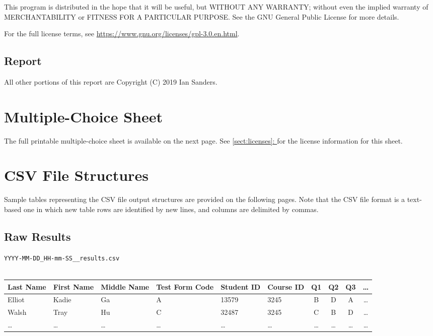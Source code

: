 \documentclass[12pt, letterpaper]{report}
\newcommand*{\sectref}[1]{\hyperref[{#1}]{\ref*{#1}: \nameref*{#1}}}
\newcommand*{\newappendix}[1]{\newpage\section{#1}}
\begin{document}
\begin{appendices}
\begin{displayquote}
This program is distributed in the hope that it will be useful,
but WITHOUT ANY WARRANTY; without even the implied warranty of
MERCHANTABILITY or FITNESS FOR A PARTICULAR PURPOSE.  See the
GNU General Public License for more details.
\end{displayquote}

For the full license terms, see
\url{https://www.gnu.org/licenses/gpl-3.0.en.html}.

\subsection{Report}

All other portions of this report are Copyright (C) 2019 Ian Sanders.

\newappendix{Multiple-Choice Sheet}
\label{sect:sheet}
The full printable multiple-choice sheet is available on the next page. See
\sectref{sect:licenses} for the license information for this sheet.


\newappendix{CSV File Structures}
Sample tables representing the CSV file output structures are provided on the
following pages. Note that the CSV file format is a text-based one in which new
table rows are identified by new lines, and columns are delimited by commas.
\begin{landscape}
\subsection{Raw Results}
\label{sect:rawresults}
\verb!YYYY-MM-DD_HH-mm-SS__results.csv!\\
\\
\begin{tabular}{ l | l | l | l | l | l | c | c | c | c }
  Last Name & First Name & Middle Name & Test Form Code & Student ID & Course ID & Q1 & Q2 & Q3 & \ldots \\
  \hline
  Elliot & Kadie  & Ga     & A      & 13579  & 3245   & B      & D      & A      & \ldots \\
  Walsh  & Tray   & Hu     & C      & 32487  & 3245   & C      & B      & D      & \ldots \\
  \ldots & \ldots & \ldots & \ldots & \ldots & \ldots & \ldots & \ldots & \ldots & \ldots
\end{tabular}

\end{landscape}
\end{appendices}
\end{document}
